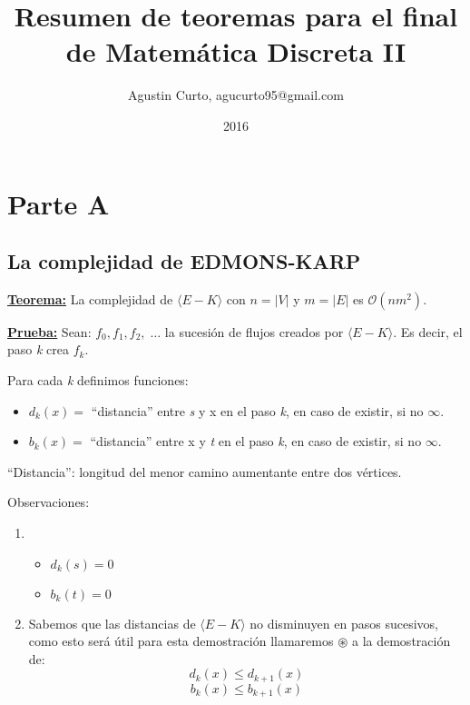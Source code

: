 \documentclass[12pt,a4paper]{report}
\author{Agustin Curto, agucurto95@gmail.com}
\title{Resumen de teoremas para el final \\ de Matemática Discreta  II}
\date{2016}
\providecommand{\abs}[1]{\lvert#1\rvert}
\begin{document}
\maketitle
\tableofcontents


\chapter{Parte A}

	\section{La complejidad de EDMONS-KARP}
		\textbf{\underline{Teorema:}} La complejidad de $\langle E-K \rangle$ con $n = \abs{V}$ y $m = \abs{E}$ es $\mathcal{O}(nm^{2})$.

		\textbf{\underline{Prueba:}} Sean: $f_{0}, f_{1}, f_{2}, \; \dotsc$ \; la sucesión de flujos creados por $\langle E-K \rangle$. Es decir, el paso \textit{k} crea $f_{k}$.
			\vspace{5mm}
			\par Para cada \textit{k} definimos funciones:
			\begin{itemize}
				\item $d_{k}(x) =$ \textquotedblleft distancia\textquotedblright \; entre \textit{s} y x en el paso \textit{k}, en caso de existir, si no $\infty$.
				\item $b_{k}(x) =$ \textquotedblleft distancia\textquotedblright \; entre x y \textit{t} en el paso \textit{k}, en caso de existir, si no $\infty$.
			\end{itemize}

			\textquotedblleft Distancia\textquotedblright: longitud del menor camino aumentante entre dos vértices.

			\vspace{5mm}
			\par Observaciones:
				\begin{enumerate}
					\item
						\begin{itemize}
							\item $d_{k}(s) = 0$
							\item $b_{k}(t) = 0$
						\end{itemize}
					\item Sabemos que las distancias de $\langle E-K \rangle$ no disminuyen en pasos sucesivos, como esto será útil para esta demostración llamaremos $\circledast$ a la demostración de:
						\[ d_{k}(x) \leq d_{k+1}(x) \]
						\[ b_{k}(x) \leq b_{k+1}(x) \]
				\end{enumerate}
\end{document}
